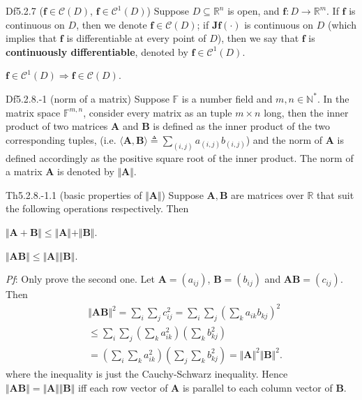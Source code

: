 \documentclass{article}
\begin{document}
\begin{Df}{Df5.2.7 ($\pmb{f}\in\mathcal{C}(D)$, $\pmb{f}\in\mathcal{C}^1(D)$)}
    Suppose $D\subseteq\mathbb{R}^n$ is open, and $\pmb{f}: D\rightarrow\mathbb{R}^m$. If $\pmb{f}$ is continuous on $D$, then we denote $\pmb{f}\in\mathcal{C}(D)$; if $\pmb{Jf}(\cdot)$ is continuous on $D$ \textcolor{Th}{(which implies that $\pmb{f}$ is differentiable at every point of $D$)}, then we say that $\pmb{f}$ is \textbf{continuously differentiable}, denoted by $\pmb{f}\in\mathcal{C}^1(D)$.
\end{Df}

\begin{Rmk}{}
    \textcolor{Th}{$\pmb{f}\in\mathcal{C}^1(D) \Rightarrow \pmb{f}\in\mathcal{C}(D)$.}
\end{Rmk}

\begin{Df}{Df5.2.8.-1 (norm of a matrix)}
    Suppose $\mathbb{F}$ is a number field and $m, n\in\mathbb{N}^\ast$. In the matrix space $\mathbb{F}^{m,n}$, consider every matrix as an tuple $m\times n$ long, then the inner product of two matrices $\pmb{A}$ and $\pmb{B}$ is defined as the inner product of the two corresponding tuples, (i.e. $\langle\pmb{A}, \pmb{B}\rangle \triangleq \sum_{(i,j)} a_{(i,j)} b_{(i,j)}$) and the norm of $\pmb{A}$ is defined accordingly as the positive square root of the inner product. The norm of a matrix $\pmb{A}$ is denoted by $\Vert \pmb{A}\Vert$.
\end{Df}

\begin{Th}{Th5.2.8.-1.1 (basic properties of $\Vert\pmb{A}\Vert$)}
    Suppose $\pmb{A}, \pmb{B}$ are matrices over $\mathbb{R}$ that suit the following operations respectively. Then
    \begin{compactenum}
        \item $\Vert \pmb{A} + \pmb{B}\Vert \leq \Vert \pmb{A}\Vert + \Vert \pmb{B}\Vert$.
        \item $\Vert \pmb{A}\pmb{B}\Vert \leq \Vert \pmb{A}\Vert\Vert \pmb{B}\Vert$.
    \end{compactenum}
    \tcblower
    \textit{Pf}: Only prove the second one. Let $\pmb{A} = (a_{ij})$, $\pmb{B} = (b_{ij})$ and $\pmb{AB} = (c_{ij})$. Then
    $$ 
    \begin{aligned}
        & \Vert \pmb{AB}\Vert^2 = \sum_i\sum_j c_{ij}^2 = \sum_i\sum_j\left(\sum_k a_{ik}b_{kj}\right)^2 \\
        & \leq \sum_i\sum_j\left(\sum_k a_{ik}^2\right)\left(\sum_k b_{kj}^2\right) \\
        & = \left( \sum_i\sum_k a_{ik}^2 \right)\left( \sum_j\sum_k b_{kj}^2 \right) = \Vert \pmb{A}\Vert^2\Vert \pmb{B}\Vert^2.
    \end{aligned}
    $$
    where the inequality is just the Cauchy-Schwarz inequality. Hence \textcolor{Th}{$\Vert \pmb{AB}\Vert = \Vert \pmb{A}\Vert\Vert \pmb{B}\Vert$ iff each row vector of $\pmb{A}$ is parallel to each column vector of $\pmb{B}$.}
\end{Th}
\end{document}
